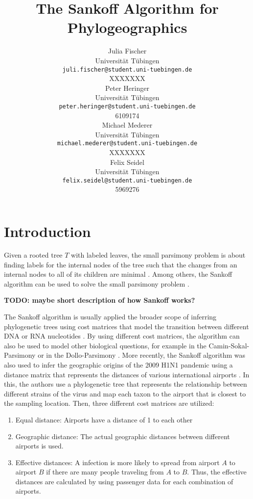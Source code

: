 \documentclass{article}
\title{The Sankoff Algorithm for Phylogeographics}
\author{
  Julia Fischer \\
  Universität Tübingen \\
  \texttt{juli.fischer@student.uni-tuebingen.de} \\
  XXXXXXX \\
  \And
  Peter Heringer \\
  Universität Tübingen \\
  \texttt{peter.heringer@student.uni-tuebingen.de} \\
  6109174 \\
  \And 
  Michael Mederer \\
  Universität Tübingen \\
  \texttt{michael.mederer@student.uni-tuebingen.de} \\
  XXXXXXX \\
  \And 
  Felix Seidel \\
  Universität Tübingen \\
  \texttt{felix.seidel@student.uni-tuebingen.de} \\
  5969276 \\
}
\begin{document}
\maketitle

\begin{abstract}
\end{abstract}


\section{Introduction}
Given a rooted tree $T$ with labeled leaves, the small parsimony problem is about
finding labels for the internal nodes of the tree such that the changes from an
internal nodes to all of its children are minimal
\cite{jonesIntroductionBioinformaticsAlgorithms2004}.
Among others, the Sankoff algorithm can be used to solve the small parsimony
problem \cite{sankoffMinimalMutationTrees1975}. 

\textbf{TODO: maybe short description of how Sankoff works?}

The Sankoff algorithm is usually applied the broader scope of
inferring phylogenetic trees using cost matrices that model the transition
between different DNA or RNA nucleotides
\cite{jonesIntroductionBioinformaticsAlgorithms2004}. By using different cost
matrices, the algorithm can also be used to model other biological questions,
for example in the Camin-Sokal-Parsimony \cite{caminMethodDeducingBranching1965}
or in the Dollo-Parsimony \cite{farrisPhylogeneticAnalysisDollo2022}. More
recently, the Sankoff algorithm was also used to infer the geographic origins of
the 2009 H1N1 pandemic using a distance matrix that represents the distances of
various international airports
\cite{reimeringPhylogeographicReconstructionUsing2020}. In this, the authors use
a phylogenetic tree that represents the relationship between different strains
of the virus and map each taxon to the airport that is closest to the sampling
location. Then, three different cost matrices are utilized:

\begin{enumerate}
  \item Equal distance: Airports have a distance of 1 to each other
  \item Geographic distance: The actual geographic distances between different
  airports is used.
  \item Effective distances: A infection is more likely to spread from
  airport $A$ to airport $B$ if there are many people traveling from $A$ to
  $B$. Thus, the effective distances are calculated by using passenger data
  for each combination of airports.
\end{enumerate}
\end{document}
